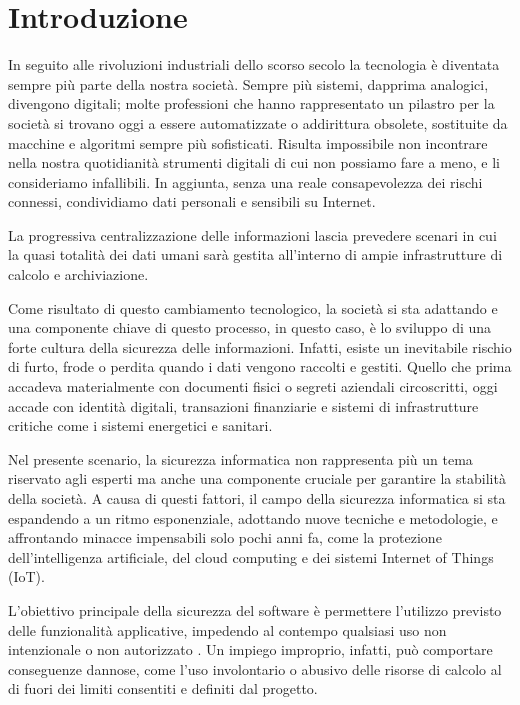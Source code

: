\chapter{Introduzione}

In seguito alle rivoluzioni industriali dello scorso secolo la tecnologia è diventata sempre più parte della nostra società. Sempre più sistemi, dapprima analogici, divengono digitali; molte professioni che hanno rappresentato un pilastro per la società si trovano oggi a essere automatizzate o addirittura obsolete, sostituite da macchine e algoritmi sempre più sofisticati. Risulta impossibile non incontrare nella nostra quotidianità strumenti digitali di cui non possiamo fare a meno, e li consideriamo infallibili. In aggiunta, senza una reale consapevolezza dei rischi connessi, condividiamo dati personali e sensibili su Internet. 

La progressiva centralizzazione delle informazioni lascia prevedere scenari in cui la quasi totalità dei dati umani sarà gestita all’interno di ampie infrastrutture di calcolo e archiviazione. 

Come risultato di questo cambiamento tecnologico, la società si sta adattando e una componente chiave di questo processo, in questo caso, è lo sviluppo di una forte cultura della sicurezza delle informazioni. Infatti, esiste un inevitabile rischio di furto, frode o perdita quando i dati vengono raccolti e gestiti. Quello che prima accadeva materialmente con documenti fisici o segreti aziendali circoscritti, oggi accade con identità digitali, transazioni finanziarie e sistemi di infrastrutture critiche come i sistemi energetici e sanitari.

Nel presente scenario, la sicurezza informatica non rappresenta più un tema riservato agli  esperti ma anche una componente cruciale per garantire la stabilità della società.  A causa di questi fattori, il campo della sicurezza informatica si sta espandendo a un ritmo esponenziale, adottando nuove tecniche e metodologie, e affrontando minacce impensabili solo pochi anni fa, come la protezione dell’intelligenza artificiale, del cloud computing e dei sistemi Internet of Things (IoT).

L’obiettivo principale della sicurezza del software è permettere l’utilizzo previsto delle funzionalità applicative, impedendo al contempo qualsiasi uso non intenzionale o non autorizzato \cite{ref1}. Un impiego improprio, infatti, può comportare conseguenze dannose, come l’uso involontario o abusivo delle risorse di calcolo al di fuori dei limiti consentiti e definiti dal progetto.

